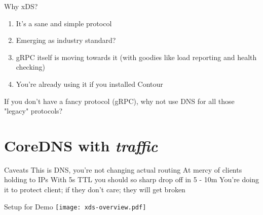 \documentclass[aspectratio=169]{beamer}
\begin{document}
    \begin{frame}{Why xDS?}
        \begin{enumerate}
            \item It's a sane and simple protocol
            \item Emerging as industry standard?
            \item gRPC itself is moving towards it (with goodies like load reporting and health checking)
            \item You're already using it if you installed Contour
        \end{enumerate}
        If you don't have a fancy protocol (gRPC), why not use DNS for all those "legacy" protocols?
    \end{frame}

    \section{CoreDNS with \emph{traffic}}

    \begin{frame}{Caveats}
        This is DNS, you're not changing actual routing
        At mercy of clients holding to IPs
        With 5s TTL you should so sharp drop off in 5 - 10m
        You're doing it to protect client; if they don't care; they will get broken
    \end{frame}

    \begin{frame}{Setup for Demo}
            \texttt{[image: xds-overview.pdf]}
    \end{frame}
\end{document}

